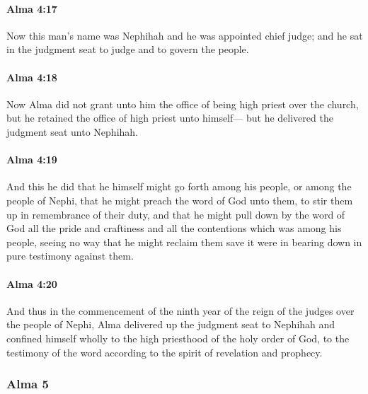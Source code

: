 		\paragraph{Alma 4:17} %
			\label{ALMA-4-17}

			Now this man's name was Nephihah and he was appointed chief judge;
			and he sat in the judgment seat to judge and to govern the people.

		\paragraph{Alma 4:18} %
			\label{ALMA-4-18}

			Now Alma did not grant unto him the office of being high priest over the church,
			but he retained the office of high priest unto himself---
			but he delivered the judgment seat unto Nephihah.

		\paragraph{Alma 4:19} %
			\label{ALMA-4-19}

			And this he did that he himself might go forth among his people,
			or among the people of Nephi,
			that he might preach the word of God unto them,
			to stir them up in remembrance of their duty,
			and that he might pull down by the word of God
			all the pride and craftiness and all the contentions which was among his people,
			seeing no way that he might reclaim them
			save it were in bearing down in pure testimony against them.

		\paragraph{Alma 4:20} %
			\label{ALMA-4-20}

			And thus in the commencement of the ninth year
			of the reign of the judges over the people of Nephi,
			Alma delivered up the judgment seat to Nephihah
			and confined himself wholly to the high priesthood of the holy order of God,
			to the testimony of the word according to the spirit of revelation and prophecy.

	\subsubsection{Alma 5} %
		\label{ALMA-5}
		
